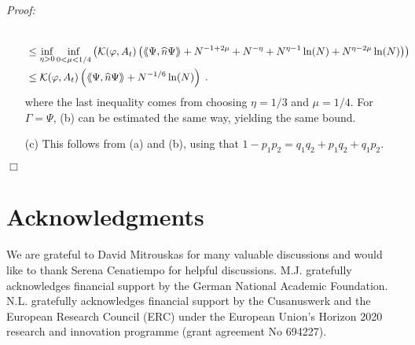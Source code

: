 \documentclass[11pt, english, american]{article}
\newcommand{\laa}{\langle\hspace{-0.08cm}\langle}
\newcommand{\raa}{\rangle\hspace{-0.08cm}\rangle}
\newenvironment{proof}{\emph{Proof:}}{\begin{flushright} $ \Box $ \end{flushright}}
\renewcommand{\phi}{\varphi}
\begin{document}
\begin{proof}
\begin{enumerate}
\begin{align*}
\\
&\leq
\inf_{ \eta>0}
\inf_{ 0<\mu <1/4}
\left(
 \mathcal{K}(\phi, A_t)
 \left(
\laa\Psi, \widehat{n} \Psi \raa
+
N^{-1 + 2 \mu}
+
N^{- \eta}
+
N^{\eta-1} \ln(N)
+
N^{\eta -2 \mu} \ln(N)
\right)
\right)
\\
&\leq
 \mathcal{K}(\phi, A_t)
 \left(
\laa\Psi, \widehat{n} \Psi \raa
+
N^{-1/6} \ln(N)
\right)
\;.
\end{align*}
where the last inequality comes from choosing $\eta=1/3$ and $\mu=1/4$.
For $\Gamma=  \Psi$, (b) can be estimated the same way, yielding the same bound.
\item[(c)]
This follows from (a) and (b), using that $1-p_1p_2= q_1q_2+p_1q_2+q_1p_2$.
\end{enumerate}
\end{proof}





\section*{Acknowledgments}
We are grateful to David Mitrouskas for many valuable discussions and would like to thank Serena Cenatiempo for helpful discussions.
M.J. gratefully acknowledges financial support by the German National Academic Foundation.
N.L. gratefully acknowledges financial support by the Cusanuswerk and the European Research Council (ERC) under the European Union's Horizon 2020 research and innovation programme (grant agreement No 694227).
\end{document}
